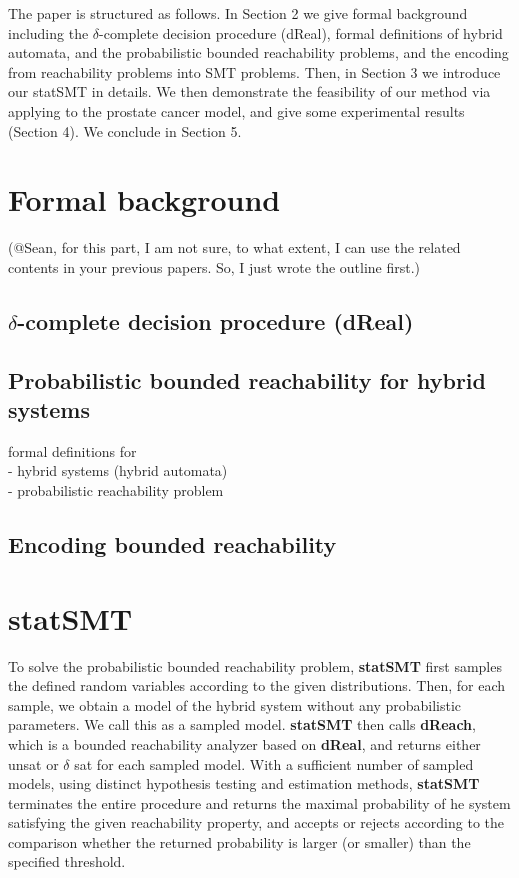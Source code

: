 \documentclass[runningheads,a4paper]{llncs}
\begin{document}
The paper is structured as follows. In Section 2 we give formal background including the $\delta$-complete decision procedure (dReal), formal definitions of hybrid automata, and the probabilistic bounded reachability problems, and the encoding from reachability problems into SMT problems. Then, in Section 3 we introduce our statSMT in details. We then demonstrate the feasibility of our method via applying to the prostate cancer model, and give some experimental results (Section 4). We conclude in Section 5.


\section{Formal background}
(@Sean, for this part, I am not sure, to what extent, I can use the related contents in your previous papers. So, I just wrote the outline first.)\\

\subsection{$\delta$-complete decision procedure (dReal)}

\subsection{Probabilistic bounded reachability for hybrid systems}
formal definitions for\\
- hybrid systems (hybrid automata)\\
- probabilistic reachability problem

\subsection{Encoding bounded reachability}



\section{statSMT}

To solve the probabilistic bounded reachability problem, {\bf statSMT} first samples the defined random variables according to the given distributions. Then, for each sample, we obtain a model of the hybrid system without any probabilistic parameters. We call this as a sampled model. {\bf statSMT} then calls {\bf dReach}, which is a bounded reachability analyzer based on {\bf dReal}, and returns either unsat or $\delta$ sat for each sampled model. With a sufficient number of sampled models, using distinct hypothesis testing and estimation methods, {\bf statSMT} terminates the entire procedure and returns the maximal probability of he system satisfying the given reachability property, and accepts or rejects according to the comparison whether the returned probability is larger (or smaller) than the specified threshold.
\end{document}
